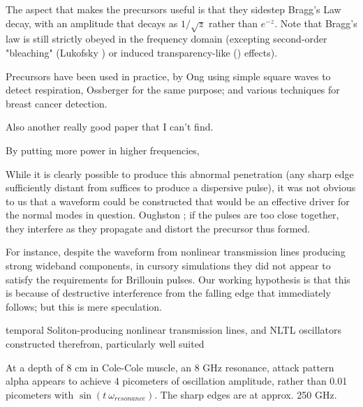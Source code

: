 \documentclass[paper.tex]{subfiles}
\begin{document}
The aspect that makes the precursors useful is that they sidestep Bragg's Law decay, with an amplitude that decays as $1/\sqrt{z}$ rather than $e^{-z}$. Note that Bragg's law is still strictly obeyed in the frequency domain (excepting second-order "bleaching" (Lukofsky \cite{Can}) or induced transparency-like (\cite{Electromagnetically1997}) effects).

Precursors have been used in practice, by Ong \cite{Detection2003} using simple square waves to detect respiration\footnotemark, Ossberger \cite{Noninvasive2004} for the same purpose; and various techniques for breast cancer detection. 


Also another really good paper that I can't find.


By putting more power in higher frequencies, 


While it is clearly possible to produce this abnormal penetration (any sharp edge sufficiently distant from  suffices to produce a dispersive pulse), it was not obvious to us that a waveform 
could be constructed that would be an effective driver for the normal modes in question. 
Oughston ; if the pulses are too close together, they interfere as they propagate and distort the precursor thus formed.


For instance, despite the waveform from nonlinear transmission lines producing strong wideband components, in cursory simulations they did not appear to satisfy the requirements for Brillouin pulses. Our working hypothesis is that this is because of destructive interference from the falling edge that immediately follows; but this is mere speculation.

temporal Soliton-producing nonlinear transmission lines, and NLTL oscillators constructed therefrom, particularly well suited 







At a depth of 8 cm in Cole-Cole muscle, an 8 GHz resonance, attack pattern alpha appears to achieve 4 picometers of oscillation amplitude, rather than 0.01 picometers with $\sin(t\ \omega_{resonance})$. The sharp edges are at approx. 250 GHz. 
\end{document}
